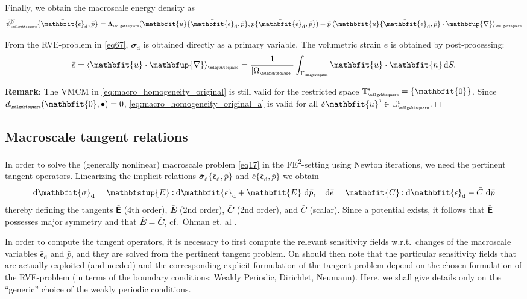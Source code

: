\documentclass[12pt,a4paper]{article}
\renewcommand{\ta}[1]{\mathbfit{#1}}
\renewcommand{\ts}[1]{\mathbfit{#1}}
\renewcommand{\tf}[1]{\mathbfsfup{#1}}
\renewcommand{\diff}{\mathbfup{\nabla}}
\renewcommand{\Box}{\mdlgwhtsquare}
\DeclarePairedDelimiter{\homgen}{\langle}{\rangle_\rve}
\renewcommand{\dev}{\mathrm{d}}
\newcommand{\volume}{|\Omega_\rve|}
\newcommand{\epspargs}{\{{\bar{\ts\epsilon}}_\dev, \bar{p}\}}
\newcommand{\rve}{
  {\mathchoice
   {\mbox{\scalebox{0.67}{$\Box$}}}
   {\mbox{\scalebox{0.67}{$\Box$}}}
   {\mbox{\scalebox{0.5}{$\Box$}}}
   {\mbox{\scalebox{0.375}{$\Box$}}}
  }
}
\begin{document}
Finally, we obtain the macroscale energy density as
\begin{equation}
    \bar{\psi}_\rve^\Neumann\epspargs =
    \Lambda_\rve(\ta{u}\epspargs,p\epspargs) + \bar{p}\,\homgen{ \ta{u}\epspargs\cdot\diff }
\label{eq105}
\end{equation}

From the RVE-problem in \cref{eq67}, $\bar{\ts\sigma}_\dev$ is obtained directly as a primary variable.
The volumetric strain $\bar{e}$ is obtained by post-processing:
\begin{align}
 \bar{e} = \homgen{\ta u\cdot\diff} = \frac{1}{\volume} \int_{\Gamma_\rve} \ta u \cdot \ta n\dif S.
\end{align}

\textbf{Remark}:
The VMCM in \cref{eq:macro_homogeneity_original} is still valid for the restricted space $\set{T}_\rve^\fluct = \{\ta 0\}$.
Since $d_\rve(\ta 0, \bullet) = 0$, \cref{eq:macro_homogeneity_original_a} is valid for all $\delta\ta u^\fluct \in \set U_\rve^\fluct$. $\Box$


\subsection{Macroscale tangent relations}
In order to solve the (generally nonlinear) macroscale problem \cref{eq17} in the FE\textsuperscript{2}-setting using Newton iterations, we need the pertinent tangent operators.
Linearizing the implicit relations $\bar{\ts\sigma}_\dev\epspargs$ and $\bar{e}\epspargs$ we obtain
\begin{align}
 \dif\bar{\ts\sigma}_\dev = \bar{\tf E} \dprod \dif\bar{\ts\epsilon}_\dev + \bar{\ts E}\, \dif\bar{p},
\quad
 \dif\bar{e} = \bar{\ts C} \dprod \dif\bar{\ts\epsilon}_\dev - \bar{C}\, \dif\bar{p}
\label{eq:periodic_difsigma}
\end{align}
thereby defining the tangents $\bar{\tf E}$ (4th order), $\bar{\ts E}$ (2nd order), $\bar{\ts C}$ (2nd order), and $\bar{C}$ (scalar).
Since a potential exists, it follows that $\bar{\tf {E}}$ possesses major symmetry and that $\bar{\ts E} = \bar{\ts C}$, cf.\ \"Ohman et. al \cite{ohman_computational_2012}.

In order to compute the tangent operators, it is necessary to first compute the relevant sensitivity fields w.r.t.\ changes of the macroscale variables $\bar{\ts\epsilon}_\dev$ and $\bar{p}$, and they are solved from the pertinent tangent problem.
On should then note that the particular sensitivity fields that are actually exploited (and needed) and the corresponding explicit formulation of the tangent problem depend on the chosen formulation of the RVE-problem (in terms of the boundary conditions: Weakly Periodic, Dirichlet, Neumann). 
Here, we shall give details only on the ``generic'' choice of the weakly periodic conditions.
\end{document}
